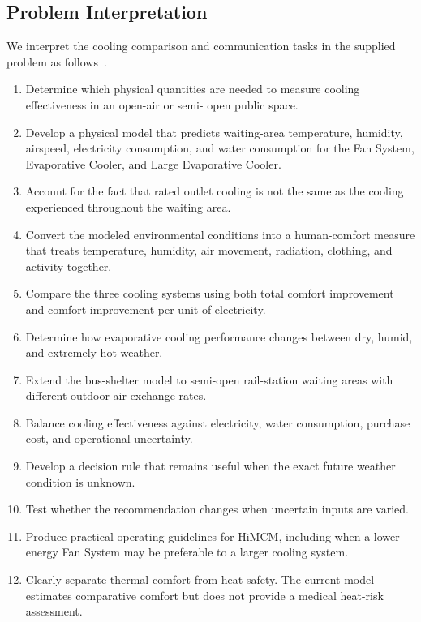 \subsection{Problem Interpretation}
We interpret the cooling comparison and communication tasks in the supplied problem as follows~\cite{comap_2026_problem_b}.

\vspace{8 pt}

\begin{enumerate}

    \item Determine which physical quantities are needed to measure cooling effectiveness in an open-air or semi-
     open public space.

    \item Develop a physical model that predicts waiting-area temperature, humidity, airspeed, electricity
     consumption, and water consumption for the Fan System, Evaporative Cooler, and Large Evaporative Cooler.

    \item Account for the fact that rated outlet cooling is not the same as the cooling experienced throughout the
     waiting area.

  \item Convert the modeled environmental conditions into a human-comfort measure that treats temperature,
     humidity, air movement, radiation, clothing, and activity together.

  \item Compare the three cooling systems using both total comfort improvement and comfort improvement per unit
     of electricity.

  \item Determine how evaporative cooling performance changes between dry, humid, and extremely hot weather.
  \item Extend the bus-shelter model to semi-open rail-station waiting areas with different outdoor-air exchange
     rates.

   \item Balance cooling effectiveness against electricity, water consumption, purchase cost, and operational
     uncertainty.

  \item Develop a decision rule that remains useful when the exact future weather condition is unknown.
  \item Test whether the recommendation changes when uncertain inputs are varied.
  \item Produce practical operating guidelines for HiMCM, including when a lower-energy Fan System may be
     preferable to a larger cooling system.

  \item Clearly separate thermal comfort from heat safety. The current model estimates comparative comfort but
     does not provide a medical heat-risk assessment.

\end{enumerate}

